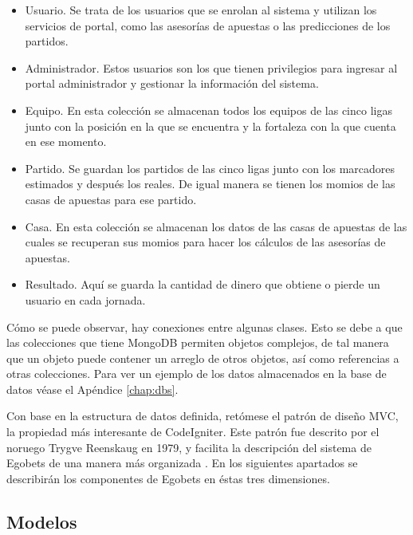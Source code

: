	\begin{itemize}
		\item Usuario. Se trata de los usuarios que se enrolan al sistema y utilizan los servicios de portal, como las asesorías de apuestas o las predicciones de los partidos.
		\item Administrador. Estos usuarios son los que tienen privilegios para ingresar al portal administrador y gestionar la información del sistema.
		\item Equipo. En esta colección se almacenan todos los equipos de las cinco ligas junto con la posición en la que se encuentra  y la fortaleza con la que cuenta en ese momento.
		\item Partido. Se guardan los partidos de las cinco ligas junto con los marcadores estimados y después los reales. De igual manera se tienen los momios de las casas de apuestas para ese partido.
		\item Casa. En esta colección se almacenan los datos de las casas de apuestas de las cuales se recuperan sus momios para hacer los cálculos de las asesorías de apuestas.
		\item Resultado. Aquí se guarda la cantidad de dinero que obtiene o pierde un usuario en cada jornada.
	\end{itemize}
	Cómo se puede observar, hay conexiones entre algunas clases. Esto se debe a que las colecciones que tiene MongoDB permiten objetos complejos, de tal manera que un objeto puede contener un arreglo de otros objetos, así como referencias a otras colecciones. Para ver un ejemplo de los datos almacenados en la base de datos véase el Apéndice \ref{chap:dbs}.

	Con base en la estructura de datos definida, retómese el patrón de diseño MVC, la propiedad más interesante de CodeIgniter. Este patrón fue descrito por el noruego Trygve Reenskaug en 1979, y facilita la descripción del sistema de Egobets de una manera más organizada \cite{upton2007codeigniter} \cite{alfredo2005ingenieria}. En los siguientes apartados se describirán los componentes de Egobets en éstas tres dimensiones.


		 \subsection{Modelos}

